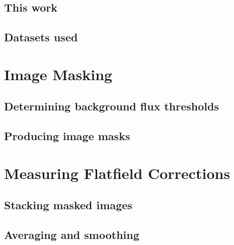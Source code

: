 \documentclass[letterpaper,11pt]{article}
\begin{document}
\subsection{This work}
\label{ssec:this_work}

\subsection{Datasets used}
\label{ssec:mask_stacks_and_mean_images}

\section{Image Masking}
\label{sec:image_masking}

\subsection{Determining background flux thresholds}
\label{ssec:determining_background_flux_thresholds}

\subsection{Producing image masks}
\label{ssec:producing_image_masks}

\section{Measuring Flatfield Corrections}
\label{sec:measuring_flatfield_corrections}

\subsection{Stacking masked images}
\label{ssec:stacking_masked_images}

\subsection{Averaging and smoothing}
\label{ssec:averaging_and_smoothing}
\end{document}
